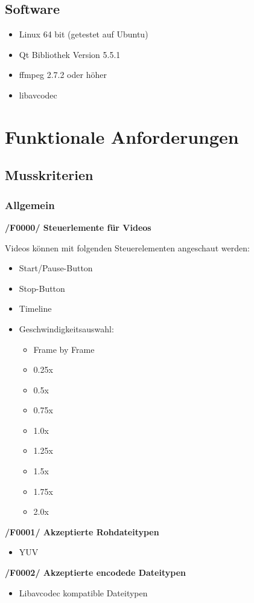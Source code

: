 \documentclass[parskip=full]{scrartcl}
\begin{document}
\subsection{Software}
\begin{itemize}
\item Linux 64 bit (getestet auf Ubuntu)
\item Qt Bibliothek Version 5.5.1
\item ffmpeg 2.7.2 oder höher
\item libavcodec
\end{itemize}
\newpage
\section{Funktionale Anforderungen}
\subsection{Musskriterien}
\subsubsection{Allgemein}
\textbf{/F0000/ Steuerlemente für Videos}

Videos können mit folgenden Steuerelementen angeschaut werden:
\begin{itemize}
\item Start/Pause-Button
\item Stop-Button
\item Timeline
\item Geschwindigkeitsauswahl:
\begin{itemize}
\item Frame by Frame
\item 0.25x
\item 0.5x
\item 0.75x
\item 1.0x
\item 1.25x
\item 1.5x
\item 1.75x
\item 2.0x
\end{itemize}
\end{itemize}

\textbf{/F0001/ Akzeptierte Rohdateitypen}

\begin{itemize}
\item YUV
\end{itemize}
\newpage
\textbf{/F0002/ Akzeptierte encodede Dateitypen}
\begin{itemize}
\item Libavcodec kompatible Dateitypen
\end{itemize}
\end{document}
